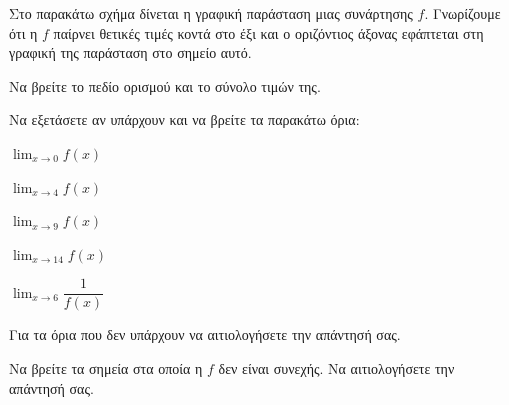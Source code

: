 Στο παρακάτω σχήμα δίνεται η γραφική παράσταση μιας συνάρτησης $f$. Γνωρίζουμε ότι η $f$ παίρνει θετικές τιμές κοντά στο έξι και ο οριζόντιος άξονας εφάπτεται στη γραφική της παράσταση στο σημείο αυτό.

\begin{alist}
\item Να βρείτε το πεδίο ορισμού και το σύνολο τιμών της. 
\item Να εξετάσετε αν υπάρχουν και να βρείτε τα παρακάτω όρια:
    \begin{rlist}
    \item $\lim_{x \to 0} f(x)$
    \item $\lim_{x \to 4} f(x)$
    \item $\lim_{x \to 9} f(x)$
    \item $\lim_{x \to 14} f(x)$
    \item $\lim_{x \to 6} \dfrac{1}{f(x)}$
    \end{rlist}
    Για τα όρια που δεν υπάρχουν να αιτιολογήσετε την απάντησή σας. 
\item Να βρείτε τα σημεία στα οποία η $f$ δεν είναι συνεχής. Να αιτιολογήσετε την απάντησή σας. 
\end{alist}